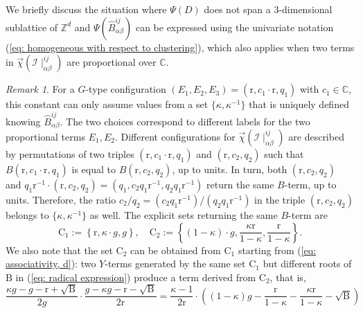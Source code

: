\documentclass[10pt]{article}
\theoremstyle{remark}%
\newtheorem{rem}{Remark}%
\theoremstyle{definition}%
\begin{document}
We briefly discuss the situation where $\Psi(D)$ does not span a $3$-dimensional sublattice of $\mathbb{Z}^{d}$ and  
$\Psi(\hat{B}_{\alpha\beta}^{ij})$ 
can be expressed using the univariate notation (\ref{eq: homogeneous with respect to clustering}), which also applies when two terms in $\overrightarrow{\chi}(\mathcal{I}\mid_{\alpha\beta}^{ij})$ are proportional
over $\mathbb{C}$. 
\begin{rem}
\label{rem: if proportional, then unique constant ratio } 
For a $G$-type configuration $(E_1,E_2,E_3)=(\mathrm{r},c_{1}\cdot\mathrm{r},q_{1})$ with 
$c_{1}\in\mathbb{C}$, this constant can only assume values from a set $\{\kappa,\kappa^{-1}\}$ that is uniquely defined knowing $\hat{B}_{\alpha\beta}^{ij}$. The two choices correspond to different labels for the two proportional terms $E_1,E_2$. Different configurations for $\overrightarrow{\chi}(\mathcal{I}\mid_{\alpha\beta}^{ij})$ are described by permutations of two triples $(\mathrm{r},c_{1}\cdot\mathrm{r},q_{1})$ and $(\mathrm{r},c_{2},q_{2})$ such that $B(\mathrm{r},c_{1}\cdot\mathrm{r},q_{1})$ is equal to $B(\mathrm{r},c_{2},q_{2})$, up to units. In turn, both $(\mathrm{r},c_{2},q_{2})$ and $q_{1}\mathrm{r}^{-1}\cdot(\mathrm{r},c_{2},q_{2})=(q_{1},c_{2}q_{1}\mathrm{r}^{-1},q_{2}q_{1}\mathrm{r}^{-1})$ return the same $B$-term, up to units. Therefore, the ratio $c_{2}/q_{2}=(c_{2}q_{1}\mathrm{r}^{-1})/(q_{2}q_{1}\mathrm{r}^{-1})$ in the triple $(\mathrm{r},c_{2},q_{2})$ belongs to $\{\kappa,\kappa^{-1}\}$ as well. The explicit sets returning the same $B$-term are 
 \begin{equation}
\mathrm{C}_{1}:=\left\{ \mathrm{r},\kappa\cdot g,g\right\} ,\quad\mathrm{C}_{2}:=\left\{ (1-\kappa)\cdot g,\frac{\kappa\mathrm{r}}{1-\kappa},\frac{\mathrm{r}}{1-\kappa}\right\} .\label{eq: two configurations for proportional}
 \end{equation}
We also note that the set $\mathrm{C}_{2}$ can be obtained from $\mathrm{C}_{1}$ starting from 
(\ref{eq: associativity, d}): two $Y$-terms generated by the same set $\mathrm{C}_{1}$ but different roots of $\mathrm{B}$ in (\ref{eq: radical expression}) produce a term derived from $\mathrm{C}_{2}$, that is,  
 \begin{equation}
    \frac{\kappa g-g-\mathrm{r}+\sqrt{\mathrm{B}}}{2g}\cdot\frac{g-\kappa g-\mathrm{r}-\sqrt{\mathrm{B}}}{2\mathrm{r}}=\frac{\kappa-1}{2\mathrm{r}}\cdot\left((1-\kappa) g-\frac{\mathrm{r}}{1-\kappa}-\frac{\kappa\mathrm{r}}{1-\kappa}-\sqrt{\mathrm{B}}\right)

\end{equation}
\end{rem}
\end{document}
